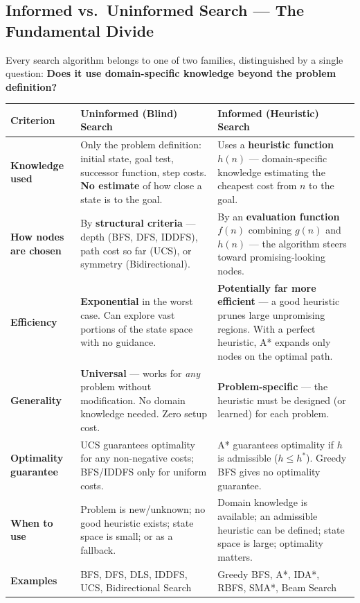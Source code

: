 \documentclass[12pt, a4paper]{article}
\begin{document}
\subsection{Informed vs.\ Uninformed Search — The Fundamental Divide}

\noindent Every search algorithm belongs to one of two families, distinguished by a single question: \textbf{Does it use domain-specific knowledge beyond the problem definition?}

\begin{center}
\renewcommand{\arraystretch}{1.5}
\begin{tabular}{p{4.5cm}|p{5.5cm}|p{5.5cm}}
\toprule
\textbf{Criterion} & \textbf{Uninformed (Blind) Search} & \textbf{Informed (Heuristic) Search} \\
\midrule
\textbf{Knowledge used} &
  Only the problem definition: initial state, goal test, successor function, step costs. \textbf{No estimate} of how close a state is to the goal. &
  Uses a \textbf{heuristic function} $h(n)$ — domain-specific knowledge estimating the cheapest cost from $n$ to the goal. \\
\midrule
\textbf{How nodes are chosen} &
  By \textbf{structural criteria} — depth (BFS, DFS, IDDFS), path cost so far (UCS), or symmetry (Bidirectional). &
  By an \textbf{evaluation function} $f(n)$ combining $g(n)$ and $h(n)$ — the algorithm steers toward promising-looking nodes. \\
\midrule
\textbf{Efficiency} &
  \textbf{Exponential} in the worst case. Can explore vast portions of the state space with no guidance. &
  \textbf{Potentially far more efficient} — a good heuristic prunes large unpromising regions. With a perfect heuristic, A* expands only nodes on the optimal path. \\
\midrule
\textbf{Generality} &
  \textbf{Universal} — works for \emph{any} problem without modification. No domain knowledge needed. Zero setup cost. &
  \textbf{Problem-specific} — the heuristic must be designed (or learned) for each problem. \\
\midrule
\textbf{Optimality guarantee} &
  UCS guarantees optimality for any non-negative costs; BFS/IDDFS only for uniform costs. &
  A* guarantees optimality if $h$ is admissible ($h \leq h^*$). Greedy BFS gives no optimality guarantee. \\
\midrule
\textbf{When to use} &
  Problem is new/unknown; no good heuristic exists; state space is small; or as a fallback. &
  Domain knowledge is available; an admissible heuristic can be defined; state space is large; optimality matters. \\
\midrule
\textbf{Examples} &
  BFS, DFS, DLS, IDDFS, UCS, Bidirectional Search &
  Greedy BFS, A*, IDA*, RBFS, SMA*, Beam Search \\
\bottomrule
\end{tabular}
\end{center}
\end{document}

